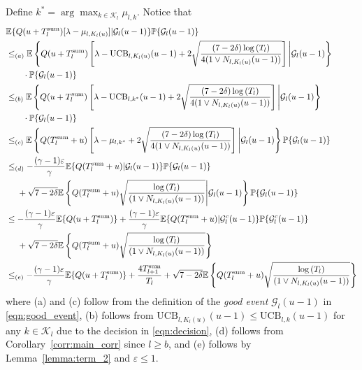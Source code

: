 \documentclass[12pt,draftcls, onecolumn]{IEEEtran}
\begin{document}
{Define $k^* = \arg\max_{k \in \mathcal{K}_l} \mu_{l,k}$. Notice that
\begin{align}
  &\mathbb{E}\{Q(u+T^{\text{sum}}_l)[\lambda - \mu_{l,K_l(u)}]|\mathcal{G}_l(u-1)\}\mathbb{P}\{\mathcal{G}_l(u-1)\} \nonumber\\
    & \leq_{(a)} \mathbb{E}\left\{Q(u+T^{\text{sum}}_l)\left[\lambda - \text{UCB}_{l,K_l(u)}(u-1) +2\sqrt{\frac{(7-2\delta)\log\left(T_l\right)}{4(1\vee N_{l,K_l(u)}(u-1))}}\right]\Bigg{|}\mathcal{G}_l(u-1) \right\}\nonumber\\&\quad\quad\cdot\mathbb{P}\{\mathcal{G}_l(u-1)\} \nonumber
    \\&\leq_{(b)} 
    \mathbb{E}\left\{ Q(u+T^{\text{sum}}_l)\left[\lambda - \text{UCB}_{l,k^*}(u-1) +2\sqrt{\frac{(7-2\delta)\log\left(T_l\right)}{4(1 \vee N_{l,K_l(u)}(u-1))}}\right]\Bigg{|}\mathcal{G}_l(u-1)\right\}\nonumber\\&\quad\quad\cdot\mathbb{P}\{\mathcal{G}_l(u-1)\}\nonumber\\&\leq_{(c)} \mathbb{E}\left\{Q(T^{\text{sum}}_l+u)\left[\lambda - \mu_{l,k^*}+2\sqrt{\frac{(7-2\delta)\log\left(T_l\right)}{4(1 \vee N_{l,K_l(u)}(u-1))}}\right]\Bigg{|}\mathcal{G}_l(u-1)\right\} \mathbb{P}\{\mathcal{G}_l(u-1)\} \nonumber
    \\&\leq_{(d)} 
    -\frac{(\gamma-1)\varepsilon}{\gamma}\mathbb{E}\{Q(T^{\text{sum}}_l+u)|\mathcal{G}_l(u-1)\}\mathbb{P}\{\mathcal{G}_l(u-1)\} \nonumber\\&\ \ \ \ + \sqrt{7-2\delta}\mathbb{E}\left\{Q(T^{\text{sum}}_l+u)\sqrt{\frac{\log\left(T_l\right)}{(1 \vee N_{l,K_l(u)}(u-1))}}\Bigg{|}\mathcal{G}_l(u-1)\right\} \mathbb{P}\{\mathcal{G}_l(u-1)\}\nonumber
    \\&\leq  
    -\frac{(\gamma-1)\varepsilon}{\gamma}\mathbb{E}\{Q(u+T^{\text{sum}}_l)\}+\frac{(\gamma-1)\varepsilon}{\gamma}\mathbb{E}\{Q(T^{\text{sum}}_l+u)|\mathcal{G}_l^c(u-1)\}\mathbb{P}\{\mathcal{G}_l^c(u-1)\} \nonumber\\&\ \ \ \ +  \sqrt{7-2\delta}\mathbb{E}\left\{Q(T^{\text{sum}}_l+u)\sqrt{\frac{\log\left(T_l\right)}{(1 \vee N_{l,K_l(u)}(u-1))}}\right\}\nonumber
    \\&\leq_{(e)}  
    -\frac{(\gamma-1)\varepsilon}{\gamma}\mathbb{E}\{Q(u+T^{\text{sum}}_l)\}+\frac{4T^{\text{sum}}_{l+1}}{T_l} +  \sqrt{7-2\delta}\mathbb{E}\left\{Q(T^{\text{sum}}_l+u)\sqrt{\frac{\log\left(T_l\right)}{(1 \vee N_{l,K_l(u)}(u-1))}}\right\} \nonumber
\end{align}  
where (a) and (c) follow from the definition of the \emph{good event} $\mathcal{G}_l(u-1)$ in \eqref{eqn:good_event}, (b) follows from $\text{UCB}_{l,K_l(u)}(u-1) \leq \text{UCB}_{l,k}(u-1)$
for any $k \in \mathcal{K}_l$ due to the decision in \eqref{eqn:decision}, (d) follows from Corollary~\ref{corr:main_corr} since $l \geq b$, and (e) follows by Lemma~\ref{lemma:term_2} and $\varepsilon \leq 1$.
}
\end{document}

